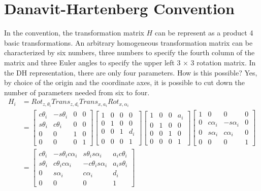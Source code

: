 \section{Danavit-Hartenberg Convention}
In the convention, the transformation matrix $H$ can be represent as a product 4 basic transformations. An arbitrary homogeneous transformation matrix can be characterized by six numbers, three numbers to specify the fourth column of the matrix and three Euler angles to specify the upper left 3 × 3 rotation matrix. In the DH representation, there are only four parameters. How is this possible? Yes, by choice of the origin and the coordinate axes, it is possible to cut down the number of parameters needed from six to four.
\begin{equation}
	\begin{split}
		H_i &= Rot_{z,\theta_i}Trans_{z,d_i}Trans_{x,a_i}Rot_{x,\alpha_i}\\
		&=\begin{bmatrix}
			c\theta_i & -s\theta_i & 0 & 0\\
			s\theta_i &  c\theta_i & 0 & 0\\
			0  & 0 &  1 & 0\\
			0  & 0 &  0 & 1
		\end{bmatrix}
		\begin{bmatrix}
			1 & 0 & 0 & 0\\
			0 & 1 & 0 & 0\\
			0 & 0 & 1 & d_i\\
			0 & 0 & 0 & 1
		\end{bmatrix}
		\begin{bmatrix}
			1 & 0 & 0 & a_i\\
			0 & 1 & 0 & 0\\
			0 & 0 & 1 & 0\\
			0 & 0 & 0 & 1
		\end{bmatrix}
		\begin{bmatrix}
			1 & 0 & 0 & 0\\
			0 & c\alpha_i & -s\alpha_i & 0\\
			0 & s\alpha_i & c\alpha_i & 0\\
			0 & 0 & 0 & 1
		\end{bmatrix}\\
	 &=\begin{bmatrix}
	 	c\theta_i & -s\theta_ic\alpha_i & s\theta_i s\alpha_i & a_ic\theta_i\\
	 	s\theta_i & c\theta_i c\alpha_i & -c\theta_i s\alpha_i & a_i s\theta_i\\
	 	0 & s\alpha_i & c\alpha_i & d_i\\
	 	0 & 0 & 0 & 1
	 \end{bmatrix}
	\end{split}
\end{equation}
